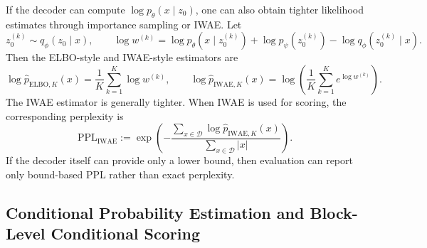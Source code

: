 If the decoder can compute $\log p_{\theta}(x\mid z_0)$, one can also obtain tighter likelihood estimates through importance sampling or IWAE. Let
\begin{equation}
z_0^{(k)}\sim q_{\phi}(z_0\mid x),
\qquad
\log w^{(k)}
=
\log p_{\theta}(x\mid z_0^{(k)})
+\log p_{\psi}(z_0^{(k)})
-\log q_{\phi}(z_0^{(k)}\mid x).
\label{eq:app_iwae_weight}
\end{equation}
Then the ELBO-style and IWAE-style estimators are
\begin{equation}
\log \widehat p_{\mathrm{ELBO},K}(x)
=
\frac{1}{K}\sum_{k=1}^{K}\log w^{(k)},
\qquad
\log \widehat p_{\mathrm{IWAE},K}(x)
=
\log\!\left(\frac{1}{K}\sum_{k=1}^{K}e^{\log w^{(k)}}\right).
\label{eq:app_p_estimators}
\end{equation}
The IWAE estimator is generally tighter. When IWAE is used for scoring, the corresponding perplexity is
\begin{equation}
\mathrm{PPL}_{\mathrm{IWAE}}
:=
\exp\left(
-\frac{\sum_{x\in\mathcal D}\log \widehat p_{\mathrm{IWAE},K}(x)}{\sum_{x\in\mathcal D}|x|}
\right).
\label{eq:app_ppl_iwae}
\end{equation}
If the decoder itself can provide only a lower bound, then evaluation can report only bound-based PPL rather than exact perplexity.

\subsection{Conditional Probability Estimation and Block-Level Conditional Scoring}
\label{app:conditional_likelihood}

